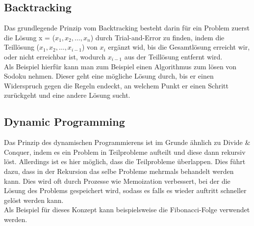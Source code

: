 \documentclass[
../AuD-Zusammenfassung.tex,
]
{subfiles}
\begin{document}
\subsection{Backtracking}
Das grundlegende Prinzip vom Backtracking besteht darin für ein Problem zuerst die Lösung x = ($x_1, x_2, \ldots, x_n$) durch Trial-and-Error zu finden, indem die Teillösung ($x_1, x_2, \ldots, x_{i-1}$) von $x_i$ ergänzt wid, bis die Gesamtlösung erreicht wir, oder nicht erreichbar ist, wodurch $x_{i-1}$ aus der Teillösung entfernt wird.\\
Als Beispiel hierfür kann man zum Beispiel einen Algorithmus zum lösen von Sodoku nehmen. Dieser geht eine mögliche Lösung durch, bis er einen Widerspruch gegen die Regeln endeckt, an welchem Punkt er einen Schritt zurückgeht und eine andere Lösung sucht.\\
\begin{algorithm}[H]
\end{algorithm}

\newpage
\subsection{Dynamic Programming}
Das Prinzip des dynamischen Programmierens ist im Grunde ähnlich zu Divide \& Conquer, indem es ein Problem in Teilprobleme aufteilt und diese dann rekursiv löst. Allerdings ist es hier möglich, dass die Teilprobleme überlappen. Dies führt dazu, dass in der Rekursion das selbe Probleme mehrmals behandelt werden kann. Dies wird oft durch Prozesse wie Memoization verbessert, bei der die Lösung des Problems gespeichert wird, sodass es falls es wieder auftritt schneller gelöst werden kann.\\
Als Beispiel für dieses Konzept kann beispielsweise die Fibonacci-Folge verwendet werden.\\
\end{document}
